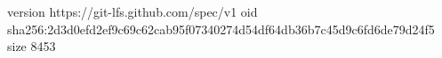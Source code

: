 version https://git-lfs.github.com/spec/v1
oid sha256:2d3d0efd2ef9c69c62cab95f07340274d54df64db36b7c45d9c6fd6de79d24f5
size 8453

